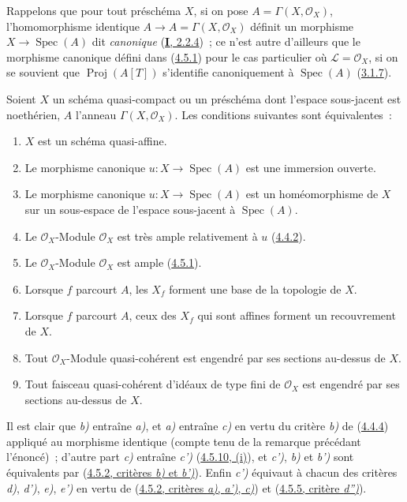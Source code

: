 Rappelons que pour tout préschéma $X$, si on pose
$A=\Gamma(X,\mathcal{O}_X)$, l'homomorphisme identique
$A\to A=\Gamma(X,\mathcal{O}_X)$ définit un morphisme
$X\to\operatorname{Spec}(A)$ dit \emph{canonique}
(\hyperref[I.2.2.4-fr]{\textbf{I}, 2.2.4})~; ce n'est autre d'ailleurs que le morphisme
canonique défini dans (\hyperref[II.4.5.1-fr]{4.5.1}) pour le cas particulier
où $\mathcal{L}=\mathcal{O}_X$, si on se souvient que
$\operatorname{Proj}(A[T])$ s'identifie canoniquement à
$\operatorname{Spec}(A)$ (\hyperref[II.3.1.7-fr]{3.1.7}).

\begin{proposition}[5.1.2]
\label{II.5.1.2-fr}
Soient $X$ un schéma quasi-compact ou un préschéma dont l'espace sous-jacent
est noethérien, $A$ l'anneau $\Gamma(X,\mathcal{O}_X)$. Les conditions
suivantes sont équivalentes~:
\begin{enumerate}
  \item[\rm{a)}] $X$ est un schéma quasi-affine.
  \item[\rm{b)}] Le morphisme canonique
  $u:X\to\operatorname{Spec}(A)$ est une immersion ouverte.
  \item[\rm{b')}] Le morphisme canonique
  $u:X\to\operatorname{Spec}(A)$ est un homéomorphisme de $X$ sur un
  sous-espace de l'espace sous-jacent à $\operatorname{Spec}(A)$.
  \item[\rm{c)}] Le $\mathcal{O}_X$-Module $\mathcal{O}_X$ est très ample
  relativement à $u$ \textup{(\hyperref[II.4.4.2-fr]{4.4.2})}.
  \item[\rm{c')}] Le $\mathcal{O}_X$-Module $\mathcal{O}_X$ est ample
  \textup{(\hyperref[II.4.5.1-fr]{4.5.1})}.
  \item[\rm{d)}] Lorsque $f$ parcourt $A$, les $X_f$ forment une base de la
  topologie de $X$.
  \item[\rm{d')}] Lorsque $f$ parcourt $A$, ceux des $X_f$ qui sont affines
  forment un recouvrement de $X$.


  \item[\rm{e)}] Tout $\mathcal{O}_X$-Module quasi-cohérent est engendré par
  ses sections au-dessus de $X$.
  \item[\rm{e')}] Tout faisceau quasi-cohérent d'idéaux de type fini de
  $\mathcal{O}_X$ est engendré par ses sections au-dessus de $X$.
\end{enumerate}
\end{proposition}

Il est clair que \emph{b)} entraîne \emph{a)}, et \emph{a)} entraîne \emph{c)} en vertu du critère \emph{b)} de
(\hyperref[II.4.4.4-fr]{4.4.4}) appliqué au morphisme identique (compte tenu
de la remarque précédant l'énoncé)~; d'autre part \emph{c)} entraîne \emph{c')}
(\hyperref[II.4.5.10-fr]{4.5.10, (i)}), et \emph{c')}, \emph{b)} et \emph{b')} sont équivalents par
(\hyperref[II.4.5.2-fr]{4.5.2, critères \emph{b)} et \emph{b')}}). Enfin \emph{c')} équivaut à
chacun des critères \emph{d)}, \emph{d')}, \emph{e)}, \emph{e')} en vertu de
(\hyperref[II.4.5.2-fr]{4.5.2, critères \emph{a)}, \emph{a')}, \emph{c)}}) et
(\hyperref[II.4.5.5-fr]{4.5.5, critère \emph{d'')}}).


